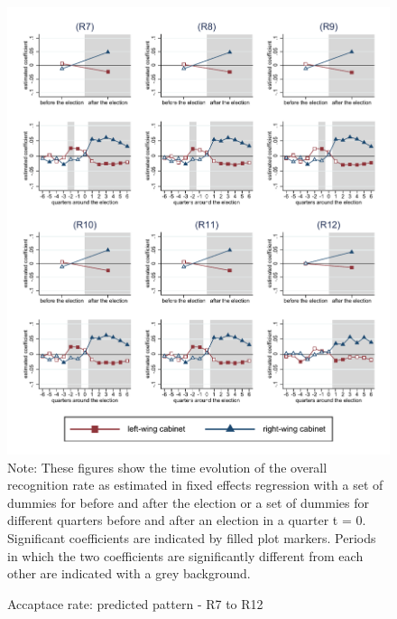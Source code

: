 \documentclass[11pt,a4paper]{scrartcl}
\begin{document}
%
%
%
%
%
%
%
%




\clearpage
\FloatBarrier


\clearpage
\FloatBarrier
\begin{figure}[!ht]
	\caption{Accaptace rate: predicted pattern - R7 to R12}
	\includegraphics[width=1\textwidth]{../results/decisions/acceptance_rate_graphs_R7-R12.pdf}
	\scriptsize{Note: These figures show the time evolution of the overall recognition rate as estimated in fixed effects regression with a set of dummies for before and after the election or a set of dummies for different quarters before and after an election in a quarter t = 0. Significant coefficients are indicated by filled plot markers. Periods in which the two coefficients are significantly different from each other are indicated with a grey background.}
\end{figure}
\end{document}
